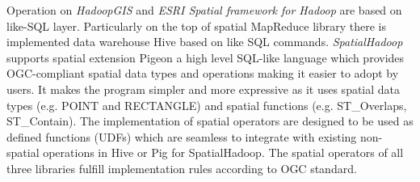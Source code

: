 \documentclass[a4paper,12pt,oneside]{report}
\begin{document}
	Operation on \textit{HadoopGIS} and \textit{ESRI Spatial framework  for Hadoop }
	 are based on like-SQL layer. 
	Particularly on the top of spatial MapReduce library there is implemented  data
	warehouse Hive based on  like SQL commands.
	\textit{SpatialHadoop} supports spatial extension Pigeon a high level SQL-like
	language which  provides OGC-compliant 
	spatial data types and operations making it easier to adopt by users. It makes
	the program simpler and more expressive 
	as it uses spatial data types (e.g. POINT and RECTANGLE) and spatial functions
	(e.g. ST\_Overlaps, ST\_Contain). 
	The implementation of spatial operators are designed to be used as defined
	functions (UDFs) which are seamless to integrate with existing  non-spatial
	operations in Hive or Pig for SpatialHadoop. The spatial operators of all three
	libraries fulfill implementation rules according to OGC standard.
	
	
	
\end{document}
